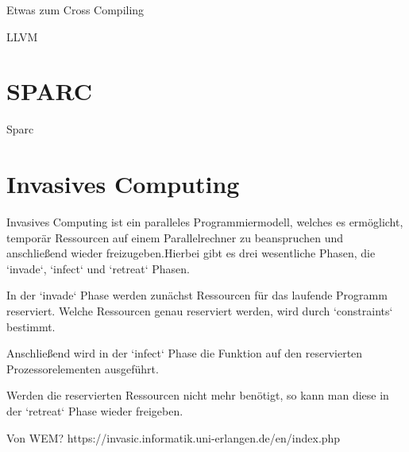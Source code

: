 Etwas zum Cross Compiling

LLVM



\section{SPARC}

Sparc

\section{Invasives Computing}

Invasives Computing ist ein paralleles Programmiermodell, welches es ermöglicht, temporär Ressourcen auf einem Parallelrechner
zu beanspruchen und anschließend wieder freizugeben.Hierbei gibt es drei wesentliche Phasen, die `invade`, `infect` und `retreat` Phasen. 

In der `invade` Phase werden zunächst Ressourcen für das laufende Programm reserviert. Welche Ressourcen genau reserviert werden,
wird durch `constraints` bestimmt.

Anschließend wird in der `infect` Phase die Funktion auf den reservierten Prozessorelementen ausgeführt.

Werden die reservierten Ressourcen nicht mehr benötigt, so kann man diese in der `retreat` Phase wieder freigeben.

Von WEM? https://invasic.informatik.uni-erlangen.de/en/index.php
